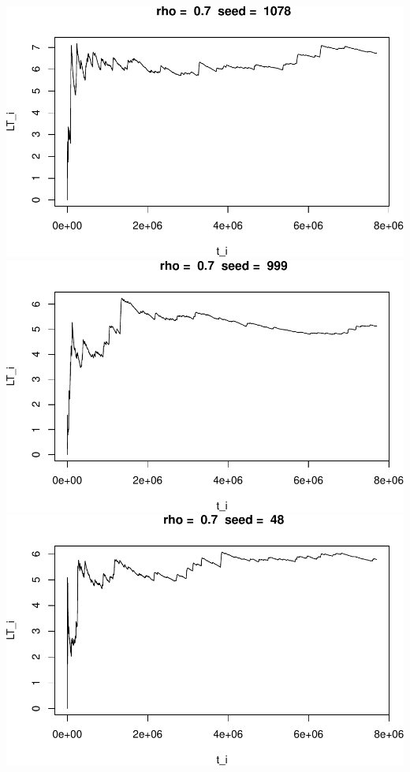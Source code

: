 \documentclass[]{article}
\begin{document}
\includegraphics{003_files/figure-latex/unnamed-chunk-16-4.pdf}
\includegraphics{003_files/figure-latex/unnamed-chunk-16-5.pdf}
\includegraphics{003_files/figure-latex/unnamed-chunk-16-6.pdf}
\end{document}
